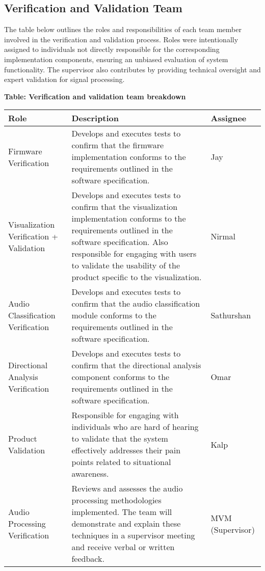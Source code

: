 \documentclass[12pt, titlepage]{article}
\begin{document}
\subsection{Verification and Validation Team}\label{sec:vnv_team}

The table below outlines the roles and responsibilities of each
team member involved in the verification and validation process. Roles were
intentionally assigned to individuals not directly responsible for the
corresponding implementation components, ensuring an unbiased evaluation of 
system functionality. The supervisor also contributes by providing technical
oversight and expert validation for signal processing.

\noindent
\textbf{Table: Verification and validation team breakdown}
\label{table:vnv_team}

\noindent
\begin{tabularx}{\textwidth}{|p{4cm}|X|p{3cm}|}
\hline
\textbf{Role} & \textbf{Description} & \textbf{Assignee} \\
\hline
Firmware Verification \label{role:firmware_verfication} &
Develops and executes tests to confirm that the firmware implementation
conforms to the requirements outlined in the software specification. &
Jay \\
\hline

Visualization Verification + Validation \label{role:visual_vnv}&
Develops and executes tests to confirm that the visualization implementation
conforms to the requirements outlined in the software specification.
Also responsible for engaging with users to validate the usability of the
product specific to the visualization. &
Nirmal \\
\hline

Audio Classification Verification \label{role:classification_verfication} &
Develops and executes tests to confirm that the audio classification module
conforms to the requirements outlined in the software specification.
&
Sathurshan \\
\hline

Directional Analysis Verification \label{role:directional_verfication}&
Develops and executes tests to confirm that the directional analysis
component conforms to the requirements outlined in the software
specification. &
Omar \\
\hline

Product Validation \label{role:product_validation} &
Responsible for engaging with individuals who are hard of hearing to
validate that the system effectively addresses their pain points related to
situational awareness. &
Kalp \\
\hline

Audio Processing Verification \label{role:audio_processing_verification}  &
Reviews and assesses the audio processing methodologies implemented. The
team will demonstrate and explain these techniques in a supervisor meeting
and receive verbal or written feedback. &
MVM (Supervisor) \\
\hline
\end{tabularx}
\end{document}
